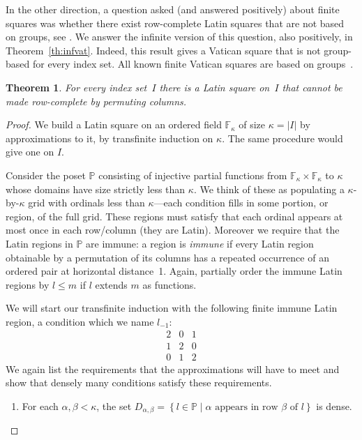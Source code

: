 \documentclass[12pt,a4paper]{article}
\newtheorem{thm}{Theorem}[section]
\newcommand{\F}{\mathbb{F}}
\newcommand{\st}{\; | \;}
\newcommand{\set}[2]{\left\{#1\st #2 \right\}}
\renewcommand{\P}{\mathbb{P}}
\begin{document}
In the other direction, a question asked (and answered positively) about finite squares was whether there exist row-complete Latin squares that are not based on groups, see \cite{CE91, DK15, Owens76}.  We answer the infinite version of this question, also positively, in Theorem~\ref{th:infvat}.  Indeed, this result gives a Vatican square that is not group-based for every index set.   All known finite Vatican squares are based on groups~\cite{TuscanCRC}.

\begin{thm}\label{th:notrcls}
For every index set~$I$ there is a Latin square on~$I$ that cannot be made row-complete by permuting columns.
\end{thm}

\begin{proof}
We build a Latin square on an ordered field $\F_\kappa$ of size $\kappa=|I|$ by approximations to it, by transfinite induction on $\kappa$. The same procedure would give one on $I$.

Consider the poset $\P$ consisting of injective partial functions from $\F_\kappa\times\F_\kappa$ to $\kappa$ whose domains have size strictly less than $\kappa$. We think of these as populating a $\kappa$-by-$\kappa$ grid with ordinals less than $\kappa$---each condition fills in some portion, or region, of the full grid. These regions must satisfy that each ordinal appears at most once in each row/column (they are Latin). Moreover we require that the Latin regions in $\P$ are immune: a region is \textit{immune} if every Latin region  obtainable by a permutation of its columns has a repeated occurrence of an ordered pair at horizontal distance~1. Again, partially order the immune Latin regions by $l\leq m$ if $l$ extends $m$ as functions.

We will start our transfinite induction with the following finite immune Latin region, a condition which we name $l_{-1}$:
$$
\begin{array}{ccc}
2  & 0 & 1 \\ 
1 & 2 &  0  \\
 0  & 1 & 2 
\end{array}
$$
We again list the requirements that the approximations will have to meet and show that densely many conditions satisfy these requirements.
\begin{enumerate}
	\item For each $\alpha, \beta<\kappa$, the set $D_{\alpha,\beta}=\set{l \in \P}{\alpha \text{ appears in row } \beta \text{ of } l}$ is dense.
	

\end{enumerate}
\end{proof}
\end{document}
